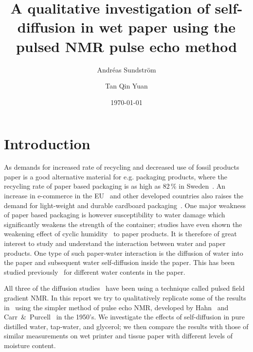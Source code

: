 \documentclass[11pt,a4paper, twocolumn,
swedish, english %
]{article}
\begin{document}


\title{A qualitative investigation of self-diffusion in wet
  paper using the pulsed NMR pulse echo method} 
\author{Andréas Sundström \and Tan Qin Yuan}
\date{\today}

\twocolumn[
\begin{@twocolumnfalse}
\maketitle
\begin{abstract}

\end{abstract}
\end{@twocolumnfalse}
]



\section{Introduction}

As demands for increased rate of recycling and decreased use of fossil
products paper is a good alternative material for e.g. packaging
products, where the recycling rate of paper based packaging is as high
as 82\,\% in Sweden~\cite{Adolfson_NVV2016}. An increase in e-commerce
in the EU~\cite{eurostat_e-commerce2017} and other developed countries
also raises the demand for light-weight and durable cardboard
packaging~\cite{Nordstrand2003}. One major weakness of paper based 
packaging is however susceptibility to water damage which
significantly weakens the strength of the container; studies have even
shown the weakening effect of cyclic
humidity~\cite{Sorensen-Hoffmann2004} to paper products. It is 
therefore of great interest to study and understand the interaction
between water and paper products. 
One type of such paper-water interaction is the diffusion of water
into the paper and subsequent water self-diffusion inside the 
paper. This has been studied previously~\cite{Perkins-Batchelor2012,
  Li-etal1992, Topgaard-Soderman2001} for different water contents in
the paper. 

All three of the diffusion studies~\cite{Perkins-Batchelor2012, Li-etal1992,
  Topgaard-Soderman2001} have been using a technique called pulsed
field gradient NMR. In this report we try to qualitatively replicate
some of the results in~\cite{Perkins-Batchelor2012} using the simpler
method of pulse echo NMR, developed by Hahn~\cite{Hahn1950} and
Carr~\&~Purcell~\cite{Carr-Purcell1954} in the 1950's. We investigate
the effects of self-diffusion in pure distilled water, tap-water, and
glycerol; we then compare the results with those of similar
measurements on wet printer and tissue paper with different levels of
moisture content. 
\end{document}
